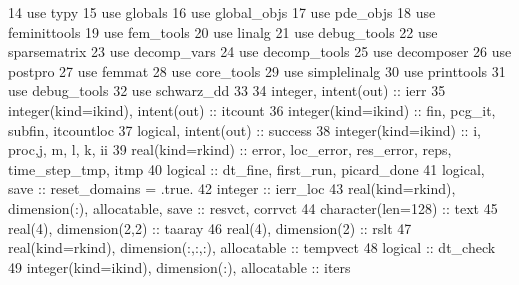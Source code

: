 \begin{DoxyCode}
14         \textcolor{keywordtype}{use }typy
15         \textcolor{keywordtype}{use }globals
16         \textcolor{keywordtype}{use }global_objs
17         \textcolor{keywordtype}{use }pde_objs
18         \textcolor{keywordtype}{use }feminittools
19         \textcolor{keywordtype}{use }fem_tools
20         \textcolor{keywordtype}{use }linalg
21         \textcolor{keywordtype}{use }debug_tools
22         \textcolor{keywordtype}{use }sparsematrix
23         \textcolor{keywordtype}{use }decomp_vars
24         \textcolor{keywordtype}{use }decomp_tools
25         \textcolor{keywordtype}{use }decomposer
26         \textcolor{keywordtype}{use }postpro
27         \textcolor{keywordtype}{use }femmat
28         \textcolor{keywordtype}{use }core_tools
29         \textcolor{keywordtype}{use }simplelinalg
30         \textcolor{keywordtype}{use }printtools
31         \textcolor{keywordtype}{use }debug_tools
32         \textcolor{keywordtype}{use }schwarz_dd
33 
34         \textcolor{keywordtype}{integer}, \textcolor{keywordtype}{intent(out)} :: ierr
35         \textcolor{keywordtype}{integer(kind=ikind)}, \textcolor{keywordtype}{intent(out)} :: itcount
36         \textcolor{keywordtype}{integer(kind=ikind)} ::  fin, pcg\_it, subfin, itcountloc
37         \textcolor{keywordtype}{logical}, \textcolor{keywordtype}{intent(out)} :: success
38         \textcolor{keywordtype}{integer(kind=ikind)} :: i, proc,j, m, l, k, ii
39         \textcolor{keywordtype}{real(kind=rkind)} :: error, loc\_error, res\_error, reps, time\_step\_tmp, itmp
40         \textcolor{keywordtype}{logical} :: dt\_fine, first\_run, picard\_done
41         \textcolor{keywordtype}{logical}, \textcolor{keywordtype}{save} :: reset\_domains = .true.
42         \textcolor{keywordtype}{integer} :: ierr\_loc
43         \textcolor{keywordtype}{real(kind=rkind)}, \textcolor{keywordtype}{dimension(:)}, \textcolor{keywordtype}{allocatable}, \textcolor{keywordtype}{save} :: resvct, corrvct
44         \textcolor{keywordtype}{character(len=128)} :: text
45         \textcolor{keywordtype}{real(4)}, \textcolor{keywordtype}{dimension(2,2)} :: taaray
46         \textcolor{keywordtype}{real(4)}, \textcolor{keywordtype}{dimension(2)} :: rslt
47         \textcolor{keywordtype}{real(kind=rkind)}, \textcolor{keywordtype}{dimension(:,:,:)}, \textcolor{keywordtype}{allocatable} :: tempvect
48         \textcolor{keywordtype}{logical} :: dt\_check
49         \textcolor{keywordtype}{integer(kind=ikind)}, \textcolor{keywordtype}{dimension(:)}, \textcolor{keywordtype}{allocatable} :: iters 

\end{DoxyCode}
